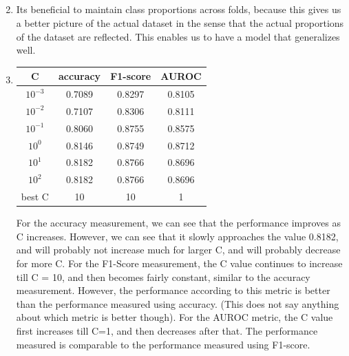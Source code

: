 \documentclass[11pt]{article}
\newcommand{\solution}[1]{{{\color{blue}{\bf Solution:} {#1}}}}
\begin{document}
\subsection{}
\begin{enumerate}
\setcounter{enumi}{1}
\item Its beneficial to maintain class proportions across folds, because this
	gives us a better picture of the actual dataset in the sense that the actual
	proportions of the dataset are reflected. This enables us to have a model that
	generalizes well.
\setcounter{enumi}{3}
\item \solution{} \newline
\begin{center}
\begingroup
\def\arraystretch{1.5}
\begin{tabular}{ c | c | c | c }
C & accuracy & F1-score & AUROC \\
\hline
$10^{-3}$ & 0.7089 & 0.8297 & 0.8105 \\
$10^{-2}$ & 0.7107 & 0.8306 & 0.8111 \\
$10^{-1}$ & 0.8060 & 0.8755 & 0.8575 \\
$10^{0}$ & 0.8146 & 0.8749 & 0.8712 \\
$10^{1}$ & 0.8182 & 0.8766 & 0.8696 \\
$10^{2}$ & 0.8182 & 0.8766 & 0.8696 \\
\hline
best C & 10 & 10 & 1
\end{tabular}
\endgroup
\end{center}
For the accuracy measurement, we can see that the performance improves as C increases. However,
we can see that it slowly approaches the value 0.8182, and will probably not increase much for
larger C, and will probably decrease for more C. \newline
For the F1-Score measurement, the C value continues to increase till C = 10, and then becomes
fairly constant, similar to the accuracy measurement. However, the performance according to this
metric is better than the performance measured using accuracy. (This does not say anything about 
which metric is better though). \newline
For the AUROC metric, the C value first increases till C=1, and then decreases after that. The
performance measured is comparable to the performance measured using F1-score. \newline 
\end{enumerate}
\end{document}
